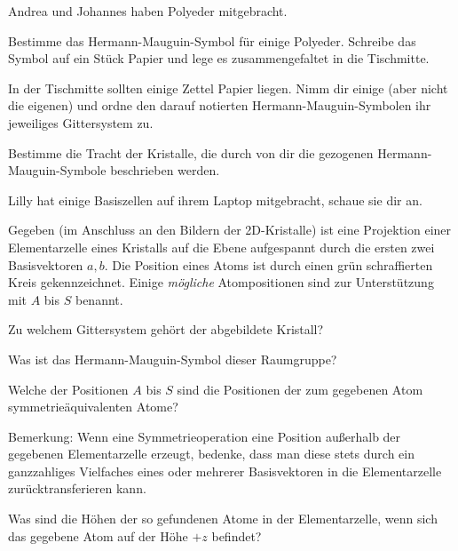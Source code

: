 \begin{sheet}
\begin{problem}
	Andrea und Johannes haben Polyeder mitgebracht. 
	\begin{subproblem}
		Bestimme das Hermann-Mauguin-Symbol für einige Polyeder. Schreibe das Symbol auf ein Stück Papier und lege es zusammengefaltet in die Tischmitte.
	\end{subproblem}
	\begin{subproblem}
		In der Tischmitte sollten einige Zettel Papier liegen. Nimm dir einige (aber nicht die eigenen) und ordne den darauf notierten Hermann-Mauguin-Symbolen ihr jeweiliges Gittersystem zu.
	\end{subproblem}
	\begin{subproblem}[difficulty={mittel}]
		Bestimme die Tracht der Kristalle, die durch von dir die gezogenen Hermann-Mauguin-Symbole beschrieben werden.
	\end{subproblem}
	
\end{problem}
\begin{problem}[difficulty={sehr leicht}]
	Lilly hat einige Basiszellen auf ihrem Laptop mitgebracht, schaue sie dir an.
\end{problem}




\begin{problem}
	Gegeben (im Anschluss an den Bildern der 2D-Kristalle) ist eine Projektion einer Elementarzelle eines Kristalls auf die Ebene aufgespannt durch die ersten zwei Basisvektoren $a,b$. Die Position eines Atoms ist durch einen grün schraffierten Kreis gekennzeichnet. Einige \emph{mögliche} Atompositionen sind zur Unterstützung mit $A$ bis $S$ benannt.
	\begin{subproblem}
	Zu welchem Gittersystem gehört der abgebildete Kristall?
	\end{subproblem}
	\begin{subproblem}
	Was ist das Hermann-Mauguin-Symbol dieser Raumgruppe?
	\end{subproblem}
	\begin{subproblem}
	Welche der Positionen $A$ bis $S$ sind die Positionen der zum gegebenen Atom symmetrieäquivalenten Atome?
	
	Bemerkung: Wenn eine Symmetrieoperation eine Position außerhalb der gegebenen Elementarzelle erzeugt, bedenke, dass man diese stets durch ein ganzzahliges Vielfaches eines oder mehrerer Basisvektoren in die Elementarzelle zurücktransferieren kann.
	\end{subproblem}
	
	\begin{subproblem}
	Was sind die Höhen der so gefundenen Atome in der Elementarzelle, wenn sich das gegebene Atom auf der Höhe $+z$ befindet?
	\end{subproblem}
\begin{figure}

\end{figure}

\end{problem}

\end{sheet}